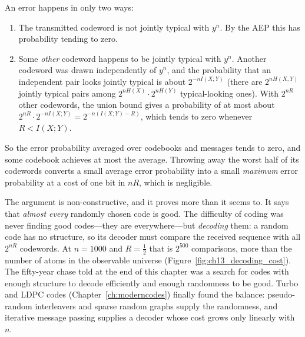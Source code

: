 
\begin{deeper}
An error happens in only two ways:
\begin{enumerate}
\item The transmitted codeword is not jointly typical with $y^n$. By the AEP this has probability
tending to zero.
\item Some \emph{other} codeword happens to be jointly typical with $y^n$. Another codeword was
drawn independently of $y^n$, and the probability that an independent pair looks jointly typical
is about $2^{-nI(X;Y)}$ (there are $2^{nH(X,Y)}$ jointly typical pairs among $2^{nH(X)}\cdot2^{nH(Y)}$
typical-looking ones). With $2^{nR}$ other codewords, the union bound gives a probability of at
most about $2^{nR}\cdot2^{-nI(X;Y)}=2^{-n(I(X;Y)-R)}$, which tends to zero whenever $R<I(X;Y)$.
\end{enumerate}
So the error probability averaged over codebooks and messages tends to zero, and some codebook
achieves at most the average. Throwing away the worst half of its codewords converts a small
average error probability into a small \emph{maximum} error probability at a cost of one bit in
$nR$, which is negligible.
\end{deeper}

The argument is non-constructive, and it proves more than it seems to. It says that \emph{almost
every} randomly chosen code is good. The difficulty of coding was never finding good codes---they
are everywhere---but \emph{decoding} them: a random code has no structure, so its decoder must
compare the received sequence with all $2^{nR}$ codewords. At $n=1000$ and $R=\frac12$ that is
$2^{500}$ comparisons, more than the number of atoms in the observable universe
(Figure~\ref{fig:ch13_decoding_cost}). The fifty-year
chase told at the end of this chapter was a search for codes with enough structure to decode
efficiently and enough randomness to be good. Turbo and LDPC codes (Chapter~\ref{ch:moderncodes})
finally found the balance: pseudo-random interleavers and sparse random graphs supply the
randomness, and iterative message passing supplies a decoder whose cost grows only linearly with
$n$.

